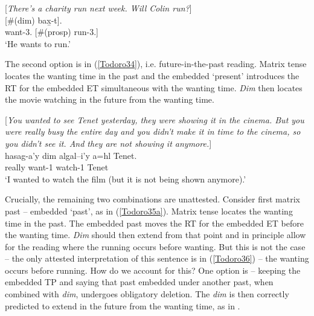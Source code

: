 \documentclass[output=paper]{langscibook}
\begin{document}
\begin{exe}
\ex \label{Todoro33}
\begin{xlist}

\ex \label{Todoro33a} [\emph{There’s a charity run next week. Will Colin run?}]\\
	[\#({dim})	{bax̱-t}].	 \\
    want-3.{\seriesII}	[\#({prosp})	run-3.{\seriesII}]	\\
\glt ‘He wants to run.’ 

\ex \label{Todoro33b}

\end{xlist}
\end{exe}

The second option is in (\ref{Todoro34}), i.e. future-in-the-past reading. Matrix tense locates the wanting time in the past and the embedded ‘present’ introduces the RT for the embedded ET simultaneous with the wanting time. \emph{Dim} then locates the movie watching in the future from the wanting time.

\begin{exe}
\ex \label{Todoro34}
\begin{xlist}

\ex \label{Todoro34a} [\emph{You wanted to see Tenet yesterday, they were showing it in the cinema. But you were really busy the entire day and you didn’t make it in time to the cinema, so you didn’t see it. And they are not showing it anymore.}]\\
 {hasag-a’y}	{dim}	{algal–i’y}		{a=hl}		{Tenet}.	 \\
    really 	want-1{\sg}		watch-1	  	Tenet	\\
\glt ‘I wanted to watch the film (but it is not being shown anymore).’ 

\ex \label{Todoro34b}

\end{xlist}
\end{exe}

Crucially, the remaining two combinations are unattested. Consider first matrix past – embedded ‘past’, as in (\ref{Todoro35a}). Matrix tense locates the wanting time in the past. The embedded past moves the RT for the embedded ET before the wanting time. \emph{Dim} should then extend from that point and in principle allow for the reading where the running occurs before wanting. But this is not the case – the only attested interpretation of this sentence is in (\ref{Todoro36}) – the wanting occurs before running. How do we account for this? One option is – keeping the embedded TP and saying that past embedded under another past, when combined with \emph{dim}, undergoes obligatory deletion. The \emph{dim} is then correctly predicted to extend in the future from the wanting time, as in .
\end{document}
